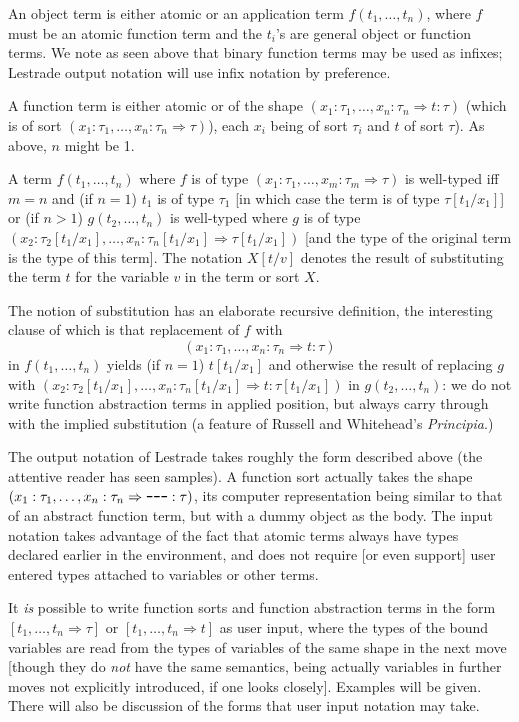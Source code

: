 \documentclass[12pt]{article}
\begin{document}
An object term is either atomic or an application term $f(t_1,\ldots,t_n)$, where $f$ must be an atomic function term
and the $t_i$'s are general object or function terms.  We note as seen above that binary function terms may be used as infixes;  Lestrade output notation will use infix notation by preference.

A function term is either atomic or of the shape $(x_1:\tau_1,\ldots,x_n:\tau_n\Rightarrow t:\tau)$ (which is of sort $(x_1:\tau_1,\ldots,x_n:\tau_n\Rightarrow \tau)$), each $x_i$ being of sort $\tau_i$ and $t$ of sort $\tau$).  As above, $n$ might be 1.

A term $f(t_1,\ldots,t_n)$ where $f$ is of type $(x_1:\tau_1,\ldots,x_m:\tau_m\Rightarrow \tau)$ is well-typed iff
$m=n$ and (if $n=1$) $t_1$ is of type $\tau_1$ [in which case the term is of type $\tau[t_1/x_1]$] or (if $n>1$)
$g(t_2,\ldots,t_n)$ is well-typed where $g$ is of type $(x_2:\tau_2[t_1/x_1],\ldots,x_n:\tau_n[t_1/x_1]\Rightarrow \tau[t_1/x_1])$ [and the type of the original term is the type of this term].  The notation $X[t/v]$ denotes the result of substituting the term $t$ for the variable $v$ in the term or sort $X$.

The notion of substitution has an elaborate recursive definition, the interesting clause of which is that replacement
of $f$ with $$(x_1:\tau_1,\ldots,x_n:\tau_n\Rightarrow t:\tau)$$ in $f(t_1,\ldots,t_n)$ yields (if $n=1$) $t[t_1/x_1]$
and otherwise the result of replacing $g$ with $(x_2:\tau_2[t_1/x_1],\ldots,x_n:\tau_n[t_1/x_1]\Rightarrow t:\tau[t_1/x_1])$
in $g(t_2,\ldots,t_n)$:  we do not write function abstraction terms in applied position, but always carry through with the implied substitution (a feature of Russell and Whitehead's {\em Principia\/}.)

The output notation of Lestrade takes roughly the form described above (the attentive reader has seen samples).   A function sort actually takes the shape $(x_1:\tau_1,\ldots,x_n:\tau_n\Rightarrow \verb|---|:\tau)$, its computer representation being similar to that of an abstract function term, but with a dummy object as the body.
The input notation takes advantage of the fact that atomic terms always have types declared earlier in the environment, and does not require [or even support] user entered types attached to variables or other terms.

It {\em is\/} possible to write function sorts and function abstraction terms in the form $[t_1,\ldots,t_n \Rightarrow \tau]$
or $[t_1,\ldots,t_n \Rightarrow t]$ as user input, where the types of the bound variables are read from the types of variables of the same shape in the next move [though they do {\em not\/} have the same semantics, being actually variables in further moves not explicitly introduced, if one looks closely].  Examples will be given.  There will also be discussion of the forms that
user input notation may take.
\end{document}
